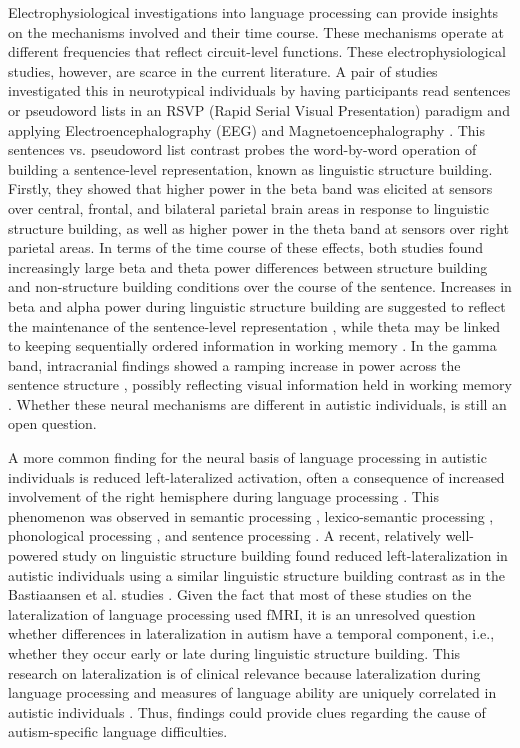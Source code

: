 Electrophysiological investigations into language processing can provide insights on the mechanisms involved and their time course. These mechanisms operate at different frequencies that reflect circuit-level functions. These electrophysiological studies, however, are scarce in the current literature. A pair of studies investigated this in neurotypical individuals by having participants read sentences or pseudoword lists in an RSVP (Rapid Serial Visual Presentation) paradigm and applying Electroencephalography (EEG) and Magnetoencephalography \citep[MEG;][]{bastiaansen2010,bastiaansen2015}. This sentences vs. pseudoword list contrast probes the word-by-word operation of building a sentence-level representation, known as linguistic structure building. Firstly, they showed that higher power in the beta band was elicited at sensors over central, frontal, and bilateral parietal brain areas in response to linguistic structure building, as well as higher power in the theta band at sensors over right parietal areas. In terms of the time course of these effects, both studies found increasingly large beta and theta power differences between structure building and non-structure building conditions over the course of the sentence. Increases in beta and alpha power during linguistic structure building are suggested to reflect the maintenance of the sentence-level representation \citep{engel2010,lewis2016}, while theta may be linked to keeping sequentially ordered information in working memory \citep{roux2014,vignali2016}. In the gamma band, intracranial findings showed a ramping increase in power across the sentence structure \citep{fedorenko2016}, possibly reflecting visual information held in working memory \citep{bastos2018,honkanen2015,roux2014,vignali2016}. Whether these neural mechanisms are different in autistic individuals, is still an open question.

A more common finding for the neural basis of language processing in autistic individuals is reduced left-lateralized activation, often a consequence of increased involvement of the right hemisphere during language processing \citep{herringshaw2016}. This phenomenon was observed in semantic processing \citep{knaus2008}, lexico-semantic processing \citep{coffeycorina2008}, phonological processing \citep{dawson1986}, and sentence processing \citep{muller1999}. A recent, relatively well-powered study on linguistic structure building found reduced left-lateralization in autistic individuals using a similar linguistic structure building contrast as in the Bastiaansen et al. studies \citep{jouravlev2020}. Given the fact that most of these studies on the lateralization of language processing used fMRI, it is an unresolved question whether differences in lateralization in autism have a temporal component, i.e., whether they occur early or late during linguistic structure building. This research on lateralization is of clinical relevance because lateralization during language processing and measures of language ability are uniquely correlated in autistic individuals \citep{lindell2013}. Thus, findings could provide clues regarding the cause of autism-specific language difficulties. 

